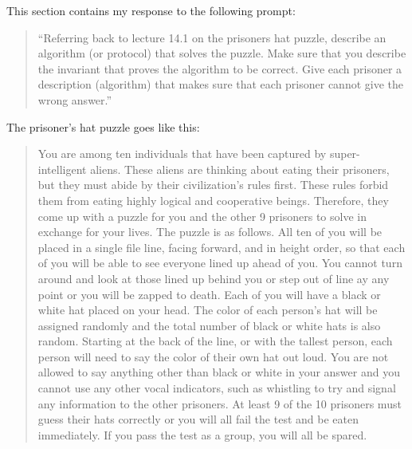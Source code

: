 \documentclass{article}
\theoremstyle{theorem}
\theoremstyle{definition}
\theoremstyle{remark}
\begin{document}
This section contains my response to the following prompt: 

\begin{quote}
``Referring back to lecture 14.1 on the prisoners hat puzzle, describe an algorithm (or protocol) that solves the puzzle. Make sure that you describe the invariant that proves the algorithm to be correct. Give each prisoner a description (algorithm) that makes sure that each prisoner cannot give the wrong answer.'' \\
\end{quote}

\noindent The prisoner's hat puzzle goes like this: 

\begin{quote}
You are among ten individuals that have been captured by super-intelligent aliens. These aliens are thinking about eating their prisoners, but they must abide by their civilization's rules first. These rules forbid them from eating highly logical and cooperative beings. Therefore, they come up with a puzzle for you and the other 9 prisoners to solve in exchange for 
your lives. The puzzle is as follows. All ten of you will be placed in a single file line, facing forward, and in height order, so that each of you will be able to see everyone lined up ahead of you. You cannot turn around and look at those lined up behind you or step out of line ay any point or you will be zapped to death. Each of you will have a black or white hat placed on your head. 
The color of each person's hat will be assigned randomly and the total number of black or white hats is also random. Starting at the back of the line, or with the tallest person, each person will need to say the color of their own hat out loud. You are not allowed to say anything other than black or white in your answer and you cannot use any other vocal indicators, such as 
whistling to try and signal any information to the other prisoners. At least 9 of the 10 prisoners must guess their hats correctly or you will all fail the test and be eaten immediately. If you pass the test as a group, you will all be spared. 
\end{quote}
\end{document}
